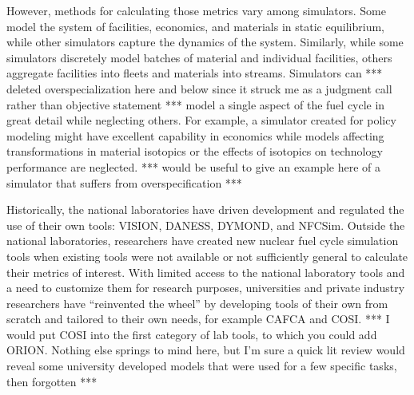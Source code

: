 However, methods for calculating those metrics vary among simulators. Some model the
system of facilities, economics, and materials in static equilibrium, while
other simulators capture the dynamics of the system.
Similarly, while some simulators discretely model batches of material and individual facilities,
others aggregate facilities into fleets and materials into streams. Simulators can *** deleted overspecialization here and below since it struck me as a judgment call rather than objective statement ***
model a single aspect of the fuel cycle in great detail while neglecting
others. For example, a simulator created for policy modeling might have excellent
capability in economics while models affecting transformations in material isotopics or the effects of isotopics on technology performance are
neglected.   *** would be useful to give an example here of a simulator that suffers from overspecification ***

Historically, the national laboratories have driven development and regulated
the use of their own tools: \gls{VISION}\cite{jacobson_verifiable_2010},
\gls{DANESS}\cite{van_den_durpel_daness_2009},
\gls{DYMOND}\cite{yacout_modeling_2005}, and
\gls{NFCSim}\cite{schneider_nfcsim:_2005}.  Outside the national laboratories,
researchers have created new nuclear fuel cycle simulation tools when existing
tools were not available or not sufficiently general to calculate their metrics
of interest.  With limited access to the national
laboratory tools and a need to customize them for research purposes,
universities and private industry researchers have ``reinvented the wheel'' by
developing tools of their own from scratch and tailored to their own needs, for
example \gls{CAFCA}\cite{guerin_impact_2009} and
\gls{COSI}\cite{boucher_cosi_2005,boucher_cosi:_2006,meyer_new_2009,coquelet-pascal_comparison_2011}.
*** I would put COSI into the first category of lab tools, to which you could add ORION.  Nothing else springs to mind here, but I'm sure a quick lit review would reveal some university developed models that were used for a few specific tasks, then forgotten ***

